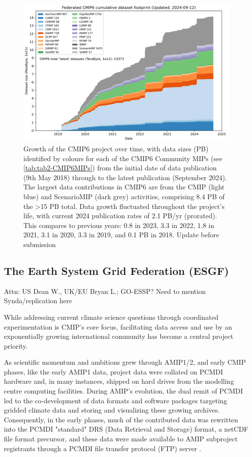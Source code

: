 \documentclass[gmd, preprint]{copernicus}
\def\cred#1{{\color{red}#1}}
\begin{document}
\begin{figure}
    \centering
    \includegraphics[width=1\linewidth]{240912T141943_ESGF-PublicationStatsPB.png}
    \caption{Growth of the CMIP6 project over time, with data sizes (PB) identified by colours for each of the CMIP6 Community MIPs (see \autoref{tab:tab2-CMIP6MIPs}) from the initial date of data publication (9th May 2018) through to the latest publication (September 2024). The largest data contributions in CMIP6 are from the CMIP (light blue) and ScenarioMIP (dark grey) activities, comprising 8.4 PB of the >15 PB total. Data growth fluctuated throughout the project's life, with current 2024 publication rates of 2.1 PB/yr (prorated). This compares to previous years: 0.8 in 2023, 3.3 in 2022, 1.8 in 2021, 3.1 in 2020, 3.3 in 2019, and 0.1 PB in 2018. \cred{Update before submission}}
    \label{fig:fig2-CMIP6DataGrowth}
\end{figure}


\subsection{The Earth System Grid Federation (ESGF)}
\label{sec:earthSystemGridFederation}
\cred{Attn: US Dean W., UK/EU Bryan L.; GO-ESSP? Need to mention Synda/replication here}

While addressing current climate science questions through coordinated experimentation is CMIP's core focus, facilitating data access and use by an exponentially growing international community has become a central project priority. 

As scientific momentum and ambitions grew through AMIP1/2, and early CMIP phases, like the early AMIP1 data, project data were collated on PCMDI hardware and, in many instances, shipped on hard drives from the modelling centre computing facilities. During AMIP's evolution, the dual remit of PCMDI led to the co-development of data formats and software packages targeting gridded climate data and storing and visualizing these growing archives. Consequently, in the early phases, much of the contributed data was rewritten into the PCMDI "standard" DRS (Data Retrieval and Storage) format, a netCDF file format precursor, and these data were made available to AMIP subproject registrants through a PCMDI file transfer protocol (FTP) server \citep[see \autoref{tab:tab1-MIPsThroughTime};][]{gates_amip_1995}.
\end{document}
